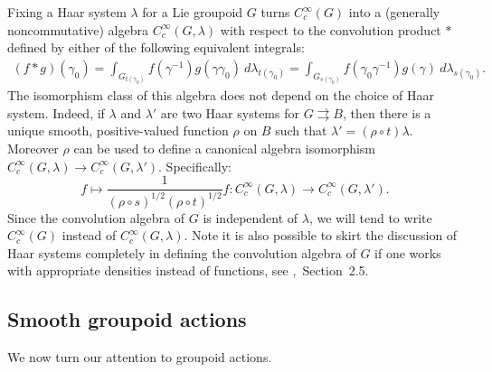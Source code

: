 \documentclass[12pt]{article}
\theoremstyle{plain}
\theoremstyle{definition}
\numberwithin{equation}{section}
\begin{document}
Fixing a Haar system $\lambda$ for a Lie groupoid $G$ turns $C_c^\infty(G)$ into a (generally noncommutative) algebra $C_c^\infty(G,\lambda)$ with respect to the convolution product $*$ defined by either of the following equivalent integrals:
\begin{align}\label{convdef}
(f*g)(\gamma_0) = \int_{G_{t(\gamma_0)}} f( \gamma^{-1}) g (\gamma \gamma_0) \ d\lambda_{t(\gamma_0)} = \int_{G_{s(\gamma_0)}} f( \gamma_0\gamma^{-1}) g (\gamma) \ d\lambda_{s(\gamma_0)}.
\end{align}
The isomorphism class of this algebra does not depend on the choice of Haar system. Indeed, if $\lambda$ and $\lambda'$ are two Haar systems for $G\rightrightarrows B$, then there is a unique smooth, positive-valued function $\rho$ on $B$ such that $\lambda' = (\rho \circ t) \lambda$. Moreover $\rho$  can be used to define a canonical algebra isomorphism $C_c^\infty(G,\lambda) \to C_c^\infty(G,\lambda')$. Specifically: 
\[ f \mapsto  \frac{1}{(\rho \circ s)^{1/2} (\rho \circ t)^{1/2}}f : C_c^\infty(G,\lambda) \to C_c^\infty(G,\lambda'). \]
Since the convolution algebra of $G$ is independent of $\lambda$, we will tend to write $C_c^\infty(G)$ instead of $C_c^\infty(G,\lambda)$. Note it is also possible to skirt the discussion of Haar systems completely in defining the convolution algebra of $G$ if one works with appropriate densities instead of functions, see \cite{Connes[BOOK]},~Section~2.5.



\subsection{Smooth groupoid actions}

We now turn our attention to groupoid actions.
\end{document}
